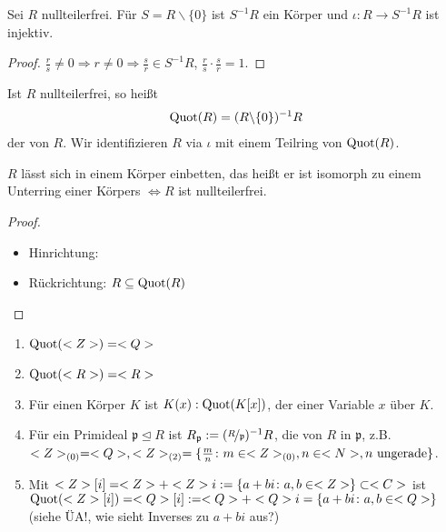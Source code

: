 \begin{conclusion}
	Sei $R$ nullteilerfrei. Für $S = R \backslash \{0\}$ ist $S^{-1}R$ ein Körper und $\iota: R \to S^{-1}R$ ist injektiv.
\end{conclusion}

\begin{proof}
	$\frac{r}{s} \neq 0 \Rightarrow r \neq 0 \Rightarrow \frac{s}{r} \in S^{-1}R$, $\frac{r}{s}\cdot \frac{s}{r} = 1.$
\end{proof}

\begin{definition}
	Ist $R$ nullteilerfrei, so heißt
	\begin{align}
		\operatorname{Quot}(R) = (R\backslash \{0\})^{-1}R\notag
	\end{align}
	der  von $R$. Wir identifizieren $R$ via $\iota$ mit einem Teilring von $\operatorname{Quot}(R)$.
\end{definition}

\begin{conclusion}
	$R$ lässt sich in einem Körper einbetten, das heißt er ist isomorph zu einem Unterring einer Körpers $\Leftrightarrow R$ ist nullteilerfrei.
\end{conclusion}

\begin{proof}
	\begin{itemize}
	\item Hinrichtung: 
	\item Rückrichtung: $R \subseteq \operatorname{Quot}(R)$
	\end{itemize}
\end{proof}

\begin{example}
	\begin{enumerate}
	\item $\operatorname{Quot}(<Z>) = <Q>$
	\item $\operatorname{Quot}(<R>) = <R>$
	\item Für einen Körper $K$ ist $K(x) : \operatorname{Quot}(K[x])$, der  einer Variable $x$ über $K$.
	\item Für ein Primideal $\mathfrak{p} \unlhd R$ ist $R_{\mathfrak{p}} := (\lnkset{R}{\mathfrak{p}})^{-1}R$, die  von $R$ in $\mathfrak{p}$, z.B. $<Z>_{(0)} = <Q>, <Z>_{(2)} = \{\frac{m}{n} \colon m \in <Z>_{(0)}, n \in <N>, n \text{ ungerade}\}$.
	\item Mit $<Z>[i] = <Z>+<Z> i := \{a+bi \colon a,b \in <Z>\} \subset <C>$ ist $\operatorname{Quot}(<Z>[i]) = <Q>[i] := <Q> + <Q> i = \{a+bi \colon a,b \in <Q>\}$ (siehe ÜA!, wie sieht Inverses zu $a+b i $ aus?)
	\end{enumerate}
\end{example}

